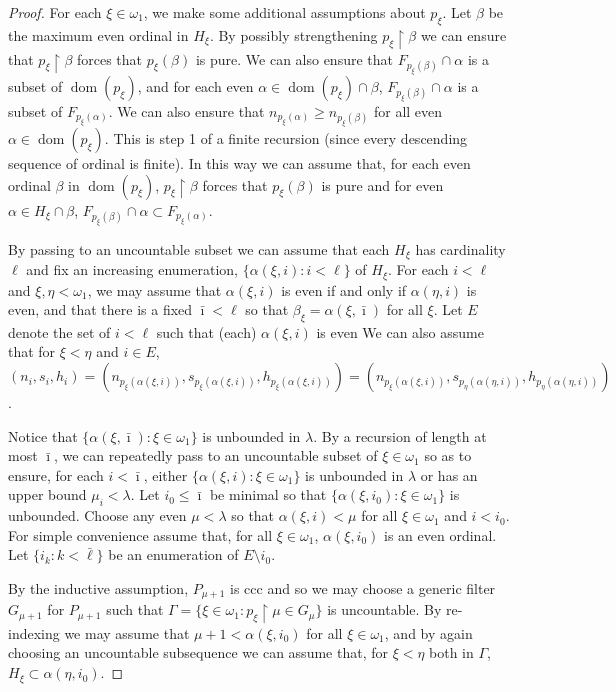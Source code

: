 \documentclass[10pt,a4paper]{amsart}
\def\dom{\operatorname{dom}}
\begin{document}
\begin{proof}
 For each $\xi\in\omega_1$, we make some additional assumptions
 about $p_\xi$. Let $\beta$ be the maximum even ordinal in $H_\xi$. 
 By possibly strengthening $p_\xi\restriction \beta$ we can ensure
 that $p_\xi\restriction \beta$ forces that $p_\xi(\beta)$ is pure. 
 We can also ensure that $F_{p_\xi(\beta)} \cap \alpha $ is a subset
 of $\dom(p_\xi)$, and  for each even $\alpha\in \dom(p_\xi)\cap \beta$,
 $F_{p_\xi(\beta )}\cap \alpha $ is a subset of $F_{p_\xi(\alpha)}$.   
 We can also ensure that $n_{p_\xi(\alpha)}\geq  n_{p_\xi(\beta)}  $ 
 for all even $\alpha\in \dom(p_\xi)$.
 This is step 1 of a finite recursion (since every descending
 sequence of ordinal is finite).  In this way we can 
 assume that, for each even ordinal $\beta$ in $\dom(p_\xi)$,
  $p_\xi\restriction \beta$ forces that $p_\xi(\beta)$ 
  is pure 
 and for even $\alpha\in H_\xi\cap \beta$,
 $F_{p_\xi(\beta)}\cap \alpha \subset
  F_{p_\xi(\alpha)}$.
  
 
 By passing to an uncountable subset we can 
 assume that each $H_\xi$ has cardinality $\ell$ and fix
 an increasing enumeration, $\{ \alpha(\xi,i) : i<\ell\}$ of $H_\xi$. 
 For each $i<\ell$ and $\xi,\eta<\omega_1$, we may assume
 that $\alpha(\xi,i)$ is even if and only if $\alpha(\eta,i)$ is even,
 and that  there is a fixed $\bar \imath<\ell$ so
 that $\beta_\xi  = \alpha(\xi, \bar \imath)$ for all $\xi$. 
 Let $E$ denote the set of $i<\ell$ such that (each)
  $\alpha(\xi,i)$ is even
We can also assume that for $\xi <\eta$ and $i\in E $,
$(n_i, s_i, h_i) =  
 (n_{p_\xi( \alpha(\xi,i))} , s_{p_\xi( \alpha(\xi,i))} , h_{p_\xi( \alpha(\xi,i))} ) = 
(n_{p_\xi( \alpha(\xi,i))} , s_{p_\eta(\alpha(\eta,   i))} , h_{p_\eta(\alpha(\eta,i))})
$.
 
 Notice that $\{ \alpha(\xi,\bar \imath) : \xi\in\omega_1\}$
 is unbounded in $\lambda$. 
 By a recursion of length at most $\bar \imath$, we can repeatedly
 pass to an uncountable subset of $\xi\in\omega_1$ so as to ensure,
  for each $i<\bar \imath$, either $\{ \alpha(\xi,i) : \xi\in\omega_1\}$
   is unbounded in $\lambda$ or has an upper bound $\mu_i<\lambda$.
   Let $i_0 \leq  \bar \imath$ be minimal so that 
    $\{ \alpha(\xi,i_0) : \xi\in\omega_1\}$ is unbounded. 
    Choose any even $\mu<\lambda$ so that $\alpha(\xi,i)<\mu$
    for all $\xi\in\omega_1$ and $i<i_0$. 
    For simple convenience assume that,
    for all $\xi\in\omega_1$, $\alpha(\xi,i_0)$ is an even ordinal. 
 Let   $\{ i_k : k <\bar\ell\} $ be an enumeration of
  $E\setminus i_0$.

By the inductive assumption, $P_{\mu+1}$ is ccc and so we may
choose a generic filter $G_{\mu+1}$ for $P_{\mu+1}$ such
that $\Gamma = \{ \xi \in\omega_1 : p_\xi \restriction \mu \in G_\mu\}$ is
uncountable. By re-indexing we may assume that $\mu+1< \alpha(\xi,i_0)$
for all $\xi\in\omega_1$, and by again choosing an
uncountable subsequence
 we can assume that, for $\xi<\eta$ both in $\Gamma$,
   $H_\xi \subset \alpha(\eta,i_0)$.


\end{proof}
\end{document}
